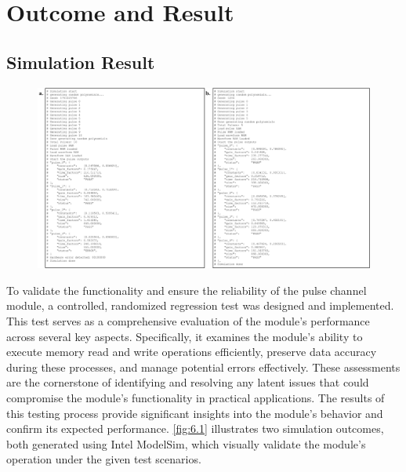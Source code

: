 \chapter{Outcome and Result}

\section{Simulation Result}
\begin{figure}[h]
    \setlength{\abovecaptionskip}{0pt}    %
    \setlength{\belowcaptionskip}{0pt}    %
    \centering
    \includegraphics[width=1\linewidth]{figures/6.1.png}
    \caption{}
    \label{fig:6.1}
\end{figure}
To validate the functionality and ensure the reliability of the pulse channel module, a controlled, randomized regression test was designed and implemented. This test serves as a comprehensive evaluation of the module’s performance across several key aspects. Specifically, it examines the module's ability to execute memory read and write operations efficiently, preserve data accuracy during these processes, and manage potential errors effectively. These assessments are the cornerstone of identifying and resolving any latent issues that could compromise the module's functionality in practical applications. The results of this testing process provide significant insights into the module's behavior and confirm its expected performance. \autoref{fig:6.1} illustrates two simulation outcomes, both generated using Intel ModelSim, which visually validate the module’s operation under the given test scenarios.

